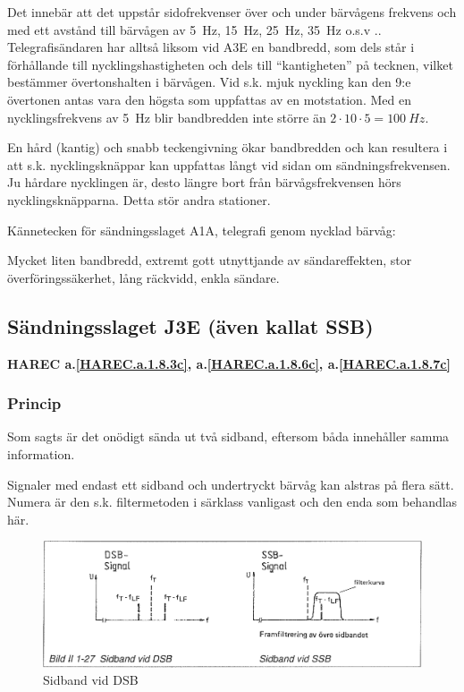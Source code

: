 Det innebär att det uppstår sidofrekvenser över och under bärvågens frekvens och
med ett avstånd till bärvågen av 5~Hz, 15~Hz, 25~Hz, 35~Hz o.s.v ..
Telegrafisändaren har alltså liksom vid A3E en bandbredd, som dels står i
förhållande till nycklingshastigheten och dels till ``kantigheten'' på tecknen,
vilket bestämmer övertonshalten i bärvågen. Vid s.k. mjuk nyckling kan den 9:e
övertonen antas vara den högsta som uppfattas av en motstation. Med en
nycklingsfrekvens av 5~Hz blir bandbredden inte större än
\(2 \cdot 10 \cdot 5 = 100\ Hz\).

En hård (kantig) och snabb teckengivning ökar bandbredden och kan resultera i
att s.k. nycklingsknäppar kan uppfattas långt vid sidan om sändningsfrekvensen.
Ju hårdare nycklingen är, desto längre bort från bärvågsfrekvensen hörs
nycklingsknäpparna. Detta stör andra stationer.

Kännetecken för sändningsslaget A1A, telegrafi genom nycklad bärvåg:

Mycket liten bandbredd, extremt gott utnyttjande av sändareffekten, stor
överföringssäkerhet, lång räckvidd, enkla sändare.

\subsection{Sändningsslaget J3E (även kallat SSB)}
\textbf{HAREC a.\ref{HAREC.a.1.8.3c}, a.\ref{HAREC.a.1.8.6c}, a.\ref{HAREC.a.1.8.7c}\label{myHAREC.a.1.8.3c}\label{myHAREC.a.1.8.6c}\label{myHAREC.a.1.8.7c}}

\subsubsection{Princip}

Som sagts är det onödigt sända ut två sidband, eftersom båda innehåller samma
information.

Signaler med endast ett sidband och undertryckt bärvåg kan alstras på flera
sätt. Numera är den s.k. filtermetoden i särklass vanligast och den enda som
behandlas här.

\begin{figure}
\includegraphics[width=\textwidth]{images/bild_2_1-27}
\caption{Sidband vid DSB}
\label{fig:BildII1-27}
\end{figure}


